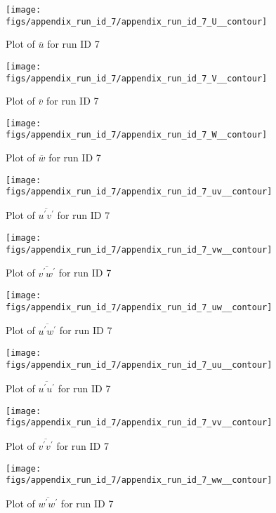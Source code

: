 \begin{figure}[H]
\centering
\texttt{[image: figs/appendix\_run\_id\_7/appendix\_run\_id\_7\_U\_\_contour]}
\caption{Plot of $\overline{u}$ for run ID 7}
\label{fig:appendix_run_id_7_U__contour}
\end{figure}


\begin{figure}[H]
\centering
\texttt{[image: figs/appendix\_run\_id\_7/appendix\_run\_id\_7\_V\_\_contour]}
\caption{Plot of $\overline{v}$ for run ID 7}
\label{fig:appendix_run_id_7_V__contour}
\end{figure}


\begin{figure}[H]
\centering
\texttt{[image: figs/appendix\_run\_id\_7/appendix\_run\_id\_7\_W\_\_contour]}
\caption{Plot of $\overline{w}$ for run ID 7}
\label{fig:appendix_run_id_7_W__contour}
\end{figure}


\begin{figure}[H]
\centering
\texttt{[image: figs/appendix\_run\_id\_7/appendix\_run\_id\_7\_uv\_\_contour]}
\caption{Plot of $\overline{u^\prime v^\prime}$ for run ID 7}
\label{fig:appendix_run_id_7_uv__contour}
\end{figure}


\begin{figure}[H]
\centering
\texttt{[image: figs/appendix\_run\_id\_7/appendix\_run\_id\_7\_vw\_\_contour]}
\caption{Plot of $\overline{v^\prime w^\prime}$ for run ID 7}
\label{fig:appendix_run_id_7_vw__contour}
\end{figure}


\begin{figure}[H]
\centering
\texttt{[image: figs/appendix\_run\_id\_7/appendix\_run\_id\_7\_uw\_\_contour]}
\caption{Plot of $\overline{u^\prime w^\prime}$ for run ID 7}
\label{fig:appendix_run_id_7_uw__contour}
\end{figure}


\begin{figure}[H]
\centering
\texttt{[image: figs/appendix\_run\_id\_7/appendix\_run\_id\_7\_uu\_\_contour]}
\caption{Plot of $\overline{u^\prime u^\prime}$ for run ID 7}
\label{fig:appendix_run_id_7_uu__contour}
\end{figure}


\begin{figure}[H]
\centering
\texttt{[image: figs/appendix\_run\_id\_7/appendix\_run\_id\_7\_vv\_\_contour]}
\caption{Plot of $\overline{v^\prime v^\prime}$ for run ID 7}
\label{fig:appendix_run_id_7_vv__contour}
\end{figure}


\begin{figure}[H]
\centering
\texttt{[image: figs/appendix\_run\_id\_7/appendix\_run\_id\_7\_ww\_\_contour]}
\caption{Plot of $\overline{w^\prime w^\prime}$ for run ID 7}
\label{fig:appendix_run_id_7_ww__contour}
\end{figure}


